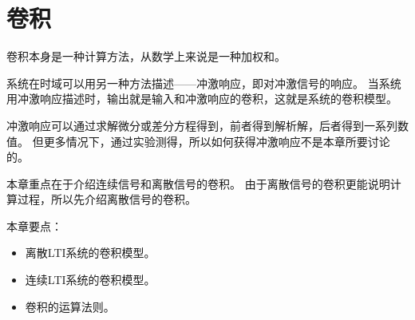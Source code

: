 \chapter{卷积}

卷积本身是一种计算方法，从数学上来说是一种加权和。

系统在时域可以用另一种方法描述——冲激响应，即对冲激信号的响应。
当系统用冲激响应描述时，输出就是输入和冲激响应的卷积，这就是系统的卷积模型。

冲激响应可以通过求解微分或差分方程得到，前者得到解析解，后者得到一系列数值。
但更多情况下，通过实验测得，所以如何获得冲激响应不是本章所要讨论的。

本章重点在于介绍连续信号和离散信号的卷积。
由于离散信号的卷积更能说明计算过程，所以先介绍离散信号的卷积。

本章要点：
\begin{itemize}
    \item 离散LTI系统的卷积模型。
    \item 连续LTI系统的卷积模型。
    \item 卷积的运算法则。
\end{itemize}

\newpage


\newpage


\newpage


\newpage





